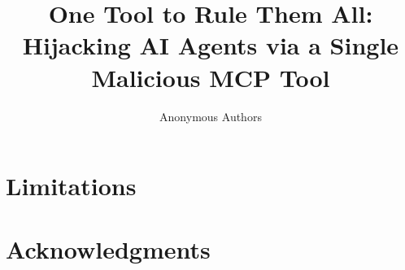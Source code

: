 \documentclass[11pt]{article}
\title{One Tool to Rule Them All: Hijacking AI Agents via a Single Malicious MCP Tool}
\author{Anonymous Authors}
\begin{document}
\maketitle














\section*{Limitations}


\section*{Acknowledgments}





\end{document}
